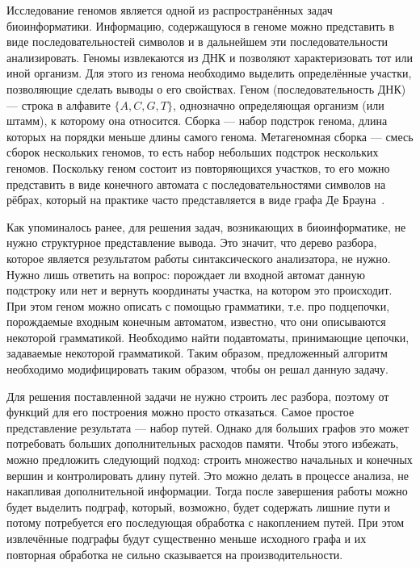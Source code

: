 \documentclass[14pt]{matmex-diploma}
\begin{document}
Исследование геномов является одной из распространённых задач биоинформатики. Информацию, содержащуюся в геноме можно представить в виде последовательностей символов и в дальнейшем эти последовательности анализировать. Геномы извлекаются из ДНК и позволяют характеризовать тот или иной организм. Для этого из генома необходимо выделить определённые участки, позволяющие сделать выводы о его свойствах. Геном (последовательность ДНК) --- строка в алфавите $\{A, C, G, T\}$, однозначно определяющая организм (или штамм), к которому она относится. Сборка --- набор подстрок генома, длина которых на порядки меньше длины самого генома. Метагеномная сборка --- смесь сборок нескольких геномов, то есть набор небольших подстрок нескольких геномов. Поскольку геном состоит из повторяющихся участков, то его можно представить в виде конечного автомата с последовательностями символов на рёбрах, который на практике часто представляется в виде графа  Де Брауна~\cite{Bruijn}.

Как упоминалось ранее, для решения задач, возникающих в биоинформатике, не нужно структурное представление вывода. Это значит, что дерево разбора, которое является результатом работы синтаксического анализатора, не нужно. Нужно лишь ответить на вопрос: порождает ли входной автомат данную подстроку или нет и вернуть координаты участка, на котором это происходит. При этом геном можно описать с помощью грамматики, т.е. про подцепочки, порождаемые входным конечным автоматом, известно, что они описываются некоторой грамматикой. Необходимо найти подавтоматы, принимающие цепочки, задаваемые некоторой грамматикой. Таким образом, предложенный алгоритм необходимо модифицировать таким образом, чтобы он решал данную задачу. 

Для решения поставленной задачи не нужно строить лес разбора, поэтому от функций для его построения можно просто отказаться. Самое простое представление результата --- набор путей. Однако для больших графов это может потребовать больших дополнительных расходов памяти. Чтобы этого избежать, можно предложить следующий подход: строить множество начальных и конечных вершин и контролировать длину путей. Это можно делать в процессе анализа, не накапливая дополнительной информации. Тогда после завершения работы можно будет выделить подграф, который, возможно, будет содержать лишние пути и потому потребуется его последующая обработка с накоплением путей. При этом извлечённые подграфы будут существенно меньше исходного графа и их повторная обработка не сильно сказывается на производительности.
\end{document}
